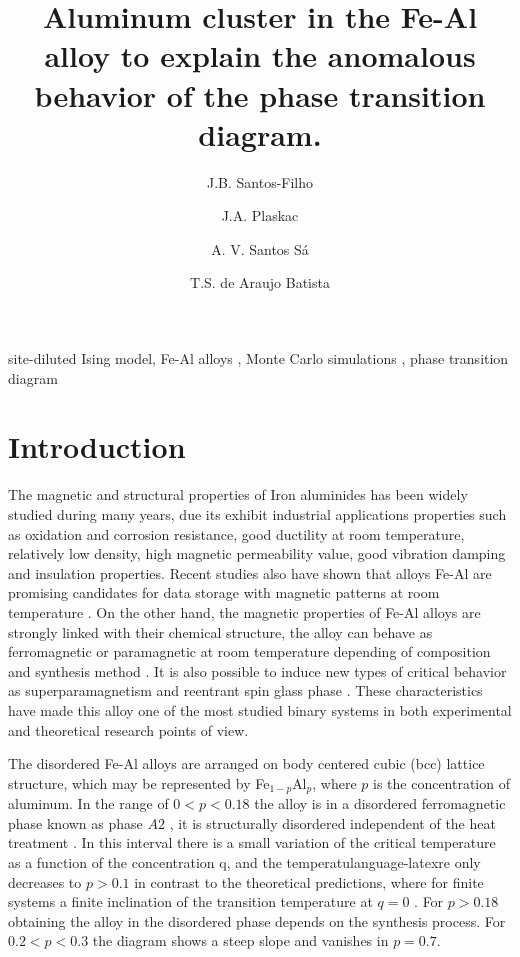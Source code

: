 \documentclass[twocolumn,5p,12pt]{elsarticle}
\author[1]{J.B. Santos-Filho\corref{mycorrespondingauthor}}
\author[2]{J.A. Plaskac}
\author[1]{A. V. Santos S\'a}
\author[3]{T.S. de Araujo Batista}
\begin{document}
\begin{frontmatter}

\title{Aluminum cluster in the Fe-Al alloy to explain the anomalous behavior of the phase transition diagram.}


\begin{abstract}
%
%
\end{abstract}

\begin{keyword}
site-diluted Ising model\sep
Fe-Al alloys  \sep
Monte Carlo simulations \sep
phase transition diagram
\end{keyword}
\end{frontmatter}


\section{Introduction}

The magnetic and structural properties of Iron aluminides has been widely studied during many years\cite{Domb1983, Kubaschewski1982}, due its exhibit industrial applications properties such as oxidation and corrosion resistance, good ductility at room temperature, relatively low density, high magnetic permeability value, good vibration damping and insulation properties. Recent studies also have shown that alloys Fe-Al are promising candidates for data storage with magnetic patterns at room temperature \cite{Menendez2009,Bali2014}.  On the other hand, the magnetic properties of Fe-Al alloys are strongly linked with their chemical structure, the alloy can behave as ferromagnetic or paramagnetic at room temperature   depending of composition and synthesis method \cite{Wolf11986,Besnus1975,Dias2009,Oubelkacem2010}. It is also possible to induce new types of critical behavior as superparamagnetism and reentrant spin glass phase \cite{Arrott1959,Shull1959,Boni1986,Takahashi1996}. These characteristics have made this alloy one of the most studied binary systems in both experimental and theoretical research points of view.

	The disordered Fe-Al alloys are arranged on body centered cubic (bcc)  lattice structure, which may be represented by Fe$_{1-p}$Al$_{p}$, where $p$ is the concentration of aluminum. In the range of $0 <p <0.18$ the alloy is in a disordered ferromagnetic phase known as phase $A2$ \cite{Sort2006,Trautvetter2011,Zamora2009}, it is structurally disordered independent of the heat treatment \cite{Kubaschewski1982}. In this interval there is a small variation of the critical temperature as a function of the concentration q, and the temperatulanguage-latexre only decreases to $p> 0.1$ in contrast to the theoretical predictions, where for finite systems a finite inclination of the transition temperature at $q = 0$ \cite{Domb1983}. For $p> 0.18$ obtaining the alloy in the disordered phase depends on the synthesis process. For $0.2<  p <0.3$ the diagram shows a steep slope and vanishes in  $p = 0.7$.
\end{document}
